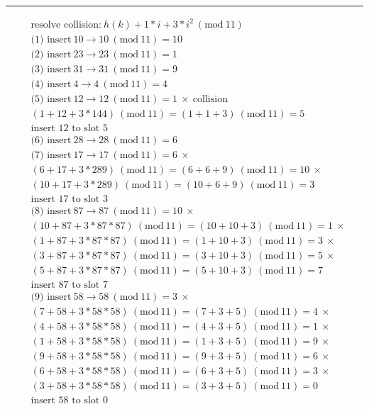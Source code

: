 \documentclass[a4paper]{article}
\newcommand{\Mod}[1]{\ (\mathrm{mod}\ #1)}
\begin{document}
\par\noindent\rule{\textwidth}{0.4pt}
\begin{minipage}{8cm}
\begin{align*}
  &\text{resolve collision:}\ h(k) + 1 * i + 3* i^2\Mod{11}\\
  &\text{(1) insert}\ 10 \to 10 \Mod{11} = 10\\
  &\text{(2) insert}\ 23 \to 23 \Mod{11} = 1\\
  &\text{(3) insert}\ 31 \to 31 \Mod{11} = 9\\
  &\text{(4) insert}\ 4 \to 4 \Mod{11} = 4\\
  &\text{(5) insert}\ 12 \to  12 \Mod{11} = 1\ \times\ \text{collision} \\
  &(1 + 12 + 3 * 144) \Mod{11} = (1 + 1 + 3) \Mod{11} = 5\\
  &\text{insert $12$ to slot $5$}\\
  &\text{(6) insert}\ 28\to 28\Mod{11} = 6\\
  &\text{(7) insert}\ 17\to 17\Mod{11} = 6\ \times \\
  &(6 + 17 + 3 * 289) \Mod{11} = (6 + 6 + 9) \Mod{11} = 10\ \times \\
  &(10 + 17 + 3 * 289) \Mod{11} = (10 + 6 + 9) \Mod{11} = 3\\
  &\text{insert $17$ to slot $3$}\\
  &\text{(8) insert}\ 87\to 87\Mod{11} = 10\ \times\\
  &(10 + 87 + 3 * 87 * 87) \Mod{11} = (10 + 10 + 3) \Mod{11} = 1\ \times \\
  &(1 + 87 + 3 * 87 * 87) \Mod{11} = (1 + 10 + 3) \Mod{11} = 3\ \times \\
  &(3 + 87 + 3 * 87 * 87) \Mod{11} = (3 + 10 + 3) \Mod{11} = 5\ \times \\
  &(5 + 87 + 3 * 87 * 87) \Mod{11} = (5 + 10 + 3) \Mod{11} = 7 \\
  &\text{insert $87$ to slot $7$}\\
  &\text{(9) insert}\ 58\to 58\Mod{11} = 3\ \times\\
  &(7 + 58 + 3 * 58 * 58) \Mod{11} = (7 + 3 + 5) \Mod{11} = 4\ \times \\
  &(4 + 58 + 3 * 58 * 58) \Mod{11} = (4 + 3 + 5) \Mod{11} = 1\ \times \\
  &(1 + 58 + 3 * 58 * 58) \Mod{11} = (1 + 3 + 5) \Mod{11} = 9\ \times \\
  &(9 + 58 + 3 * 58 * 58) \Mod{11} = (9 + 3 + 5) \Mod{11} = 6\ \times \\
  &(6 + 58 + 3 * 58 * 58) \Mod{11} = (6 + 3 + 5) \Mod{11} = 3\ \times \\
  &(3 + 58 + 3 * 58 * 58) \Mod{11} = (3 + 3 + 5) \Mod{11} = 0 \\
  &\text{insert $58$ to slot $0$}\\
\end{align*}
\end{minipage}
\end{document}
